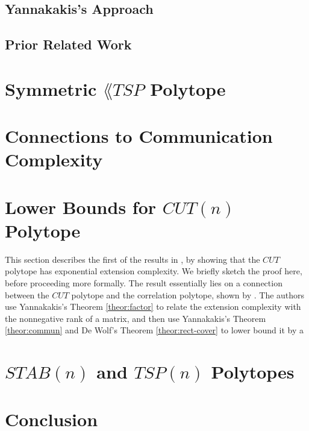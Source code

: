 \documentclass{article}
\theoremstyle{definition}
\theoremstyle{remark}
\begin{document}
\subsection{Yannakakis's Approach}
\label{sec:Yannakakis}

\subsection{Prior Related Work}


\section{Symmetric $\lang{TSP}$ Polytope}


\section{Connections to Communication Complexity}


\section{Lower Bounds for $CUT(n)$ Polytope}

This section describes the first of the results in \cite{fiorini}, by showing that the $CUT$ polytope has exponential extension complexity. We briefly sketch the proof here, before proceeding more formally. The result essentially lies on a connection between the $CUT$ polytope and the correlation polytope, shown by \cite{de-simone}. The authors use Yannakakis's Theorem \ref{theor:factor} to relate the extension complexity with the nonnegative rank of a matrix, and then use Yannakakis's Theorem \ref{theor:commun} and De Wolf's Theorem \ref{theor:rect-cover} to lower bound it by a

\section{$STAB(n)$ and $TSP(n)$ Polytopes}


\section{Conclusion}



\end{document}

